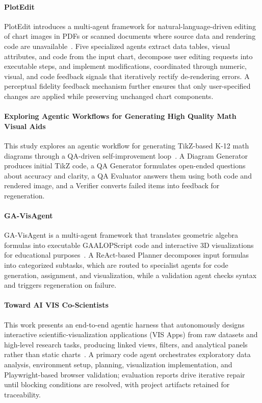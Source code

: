 \paragraph{PlotEdit}
PlotEdit introduces a multi-agent framework for natural-language-driven editing of chart images in PDFs or scanned documents where source data and rendering code are unavailable~\cite{avg250111233}. Five specialized agents extract data tables, visual attributes, and code from the input chart, decompose user editing requests into executable steps, and implement modifications, coordinated through numeric, visual, and code feedback signals that iteratively rectify de-rendering errors. A perceptual fidelity feedback mechanism further ensures that only user-specified changes are applied while preserving unchanged chart components.

\paragraph{Exploring Agentic Workflows for Generating High Quality Math Visual Aids}
This study explores an agentic workflow for generating TikZ-based K-12 math diagrams through a QA-driven self-improvement loop~\cite{avg260709839}. A Diagram Generator produces initial TikZ code, a QA Generator formulates open-ended questions about accuracy and clarity, a QA Evaluator answers them using both code and rendered image, and a Verifier converts failed items into feedback for regeneration.

\paragraph{GA-VisAgent}
GA-VisAgent is a multi-agent framework that translates geometric algebra formulas into executable GAALOPScript code and interactive 3D visualizations for educational purposes~\cite{avg260501299}. A ReAct-based Planner decomposes input formulas into categorized subtasks, which are routed to specialist agents for code generation, assignment, and visualization, while a validation agent checks syntax and triggers regeneration on failure.

\paragraph{Toward AI VIS Co-Scientists}
This work presents an end-to-end agentic harness that autonomously designs interactive scientific-visualization applications (VIS Apps) from raw datasets and high-level research tasks, producing linked views, filters, and analytical panels rather than static charts~\cite{avg260521825}. A primary code agent orchestrates exploratory data analysis, environment setup, planning, visualization implementation, and Playwright-based browser validation; evaluation reports drive iterative repair until blocking conditions are resolved, with project artifacts retained for traceability. 


